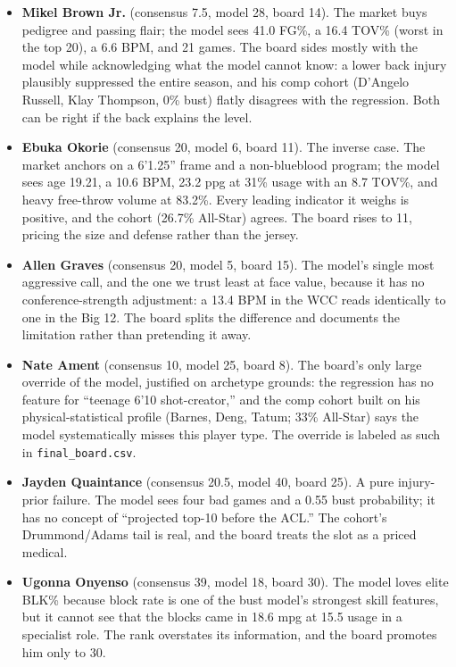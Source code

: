 \documentclass[
  10pt,
]{article}
\providecommand{\tightlist}{%
  \setlength{\itemsep}{0pt}\setlength{\parskip}{0pt}}
\begin{document}
\begin{itemize}
\tightlist
\item
  \textbf{Mikel Brown Jr.} (consensus 7.5, model 28, board 14). The market buys
  pedigree and passing flair; the model sees 41.0 FG\%, a 16.4 TOV\% (worst in
  the top 20), a 6.6 BPM, and 21 games. The board sides mostly with the model
  while acknowledging what the model cannot know: a lower back injury plausibly
  suppressed the entire season, and his comp cohort (D'Angelo Russell, Klay
  Thompson, 0\% bust) flatly disagrees with the regression. Both can be right if
  the back explains the level.
\item
  \textbf{Ebuka Okorie} (consensus 20, model 6, board 11). The inverse case. The
  market anchors on a 6'1.25'' frame and a non-blueblood program; the model sees
  age 19.21, a 10.6 BPM, 23.2 ppg at 31\% usage with an 8.7 TOV\%, and heavy
  free-throw volume at 83.2\%. Every leading indicator it weighs is positive,
  and the cohort (26.7\% All-Star) agrees. The board rises to 11, pricing the
  size and defense rather than the jersey.
\item
  \textbf{Allen Graves} (consensus 20, model 5, board 15). The model's single
  most aggressive call, and the one we trust least at face value, because it has
  no conference-strength adjustment: a 13.4 BPM in the WCC reads identically to
  one in the Big 12. The board splits the difference and documents the
  limitation rather than pretending it away.
\item
  \textbf{Nate Ament} (consensus 10, model 25, board 8). The board's only large
  override of the model, justified on archetype grounds: the regression has no
  feature for ``teenage 6'10 shot-creator,'' and the comp cohort built on his
  physical-statistical profile (Barnes, Deng, Tatum; 33\% All-Star) says the
  model systematically misses this player type. The override is labeled as such
  in \texttt{final\_board.csv}.
\item
  \textbf{Jayden Quaintance} (consensus 20.5, model 40, board 25). A pure
  injury-prior failure. The model sees four bad games and a 0.55 bust
  probability; it has no concept of ``projected top-10 before the ACL.'' The
  cohort's Drummond/Adams tail is real, and the board treats the slot as a
  priced medical.
\item
  \textbf{Ugonna Onyenso} (consensus 39, model 18, board 30). The model loves
  elite BLK\% because block rate is one of the bust model's strongest skill
  features, but it cannot see that the blocks came in 18.6 mpg at 15.5 usage in
  a specialist role. The rank overstates its information, and the board promotes
  him only to 30.
\end{itemize}
\end{document}
